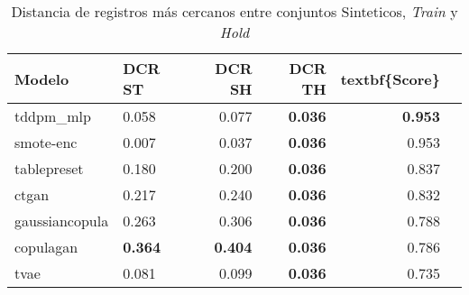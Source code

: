 \begin{table}[H]
\centering
\caption{Distancia de registros más cercanos entre conjuntos Sinteticos, \emph{Train} y \emph{Hold}}
\label{table-dcr-king county-a-1}
\begin{tabular}{|l|l|r|r|r|r|}
\hline
\rowcolor[gray]{0.8}
Modelo & DCR ST & DCR SH & DCR TH & textbf\{Score\} \\
\hline tddpm\_mlp & 0.058 & 0.077 & \bfseries 0.036 & \bfseries 0.953 \\
\hline smote-enc & \cellcolor{red} 0.007 & \cellcolor{red} 0.037 & \bfseries 0.036 & 0.953 \\
\hline tablepreset & 0.180 & 0.200 & \bfseries 0.036 & 0.837 \\
\hline ctgan & 0.217 & 0.240 & \bfseries 0.036 & 0.832 \\
\hline gaussiancopula & 0.263 & 0.306 & \bfseries 0.036 & 0.788 \\
\hline copulagan & \bfseries 0.364 & \bfseries 0.404 & \bfseries 0.036 & 0.786 \\
\hline tvae & 0.081 & 0.099 & \bfseries 0.036 & 0.735 \\
\hline
\end{tabular}
\end{table}
